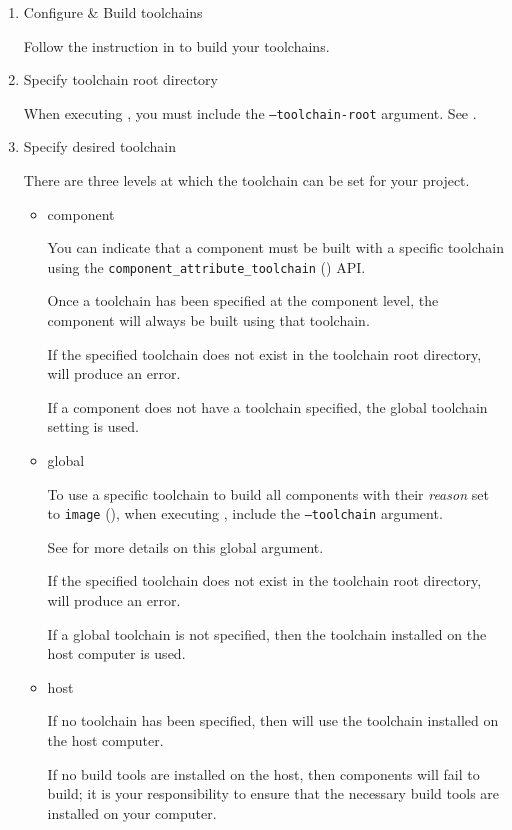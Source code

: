 \begin{enumerate}
\item Configure \& Build toolchains

  Follow the instruction in  to
  build your toolchains.

\item Specify toolchain root directory

  When executing \lmsbw, you must include the
  \texttt{--toolchain-root} argument.  See
  .

\item Specify desired toolchain

  There are three levels at which the toolchain can be set for your
  project.

  \begin{itemize}
  \item component

    You can indicate that a component must be built with a specific
    toolchain using the \texttt{component\_attribute\_toolchain}
    () API.

    Once a toolchain has been specified at the component level, the
    component will always be built using that toolchain.

    If the specified toolchain does not exist in the toolchain root
    directory, \lmsbw will produce an error.

    If a component does not have a toolchain specified, the global
    toolchain setting is used.

  \item global

    To use a specific toolchain to build all components with their
    \emph{reason} set to \texttt{image} (),
    when executing \lmsbw, include the \texttt{--toolchain} argument.

    See  for more details on this global
    argument.

    If the specified toolchain does not exist in the toolchain root
    directory, \lmsbw will produce an error.

    If a global toolchain is not specified, then the toolchain
    installed on the host computer is used.

  \item host

    If no toolchain has been specified, then \lmsbw will use the
    toolchain installed on the host computer.

    If no build tools are installed on the host, then components will
    fail to build; it is your responsibility to ensure that the
    necessary build tools are installed on your computer.

  \end{itemize}

\end{enumerate}

